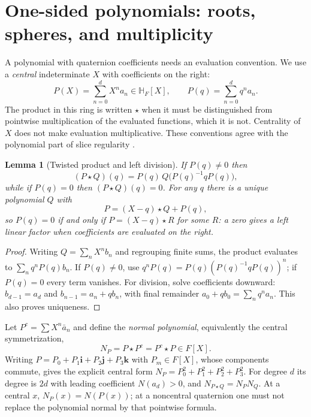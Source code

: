 \documentclass[11pt,letterpaper]{article}
\numberwithin{equation}{section}
\newtheorem{lemma}[lemma]{Lemma}
\theoremstyle{definition}
\theoremstyle{remark}
\newcommand{\HF}{\mathbb H_F}
\newcommand{\ii}{\mathbf i}
\newcommand{\jj}{\mathbf j}
\newcommand{\kk}{\mathbf k}
\begin{document}
\section{One-sided polynomials: roots, spheres, and multiplicity}\label{squat:sec:polynomials}

A polynomial with quaternion coefficients needs an evaluation convention. We use a
\emph{central} indeterminate $X$ with coefficients on the right:
\[
 P(X)=\sum_{n=0}^dX^na_n\in\HF[X],\qquad P(q)=\sum_{n=0}^dq^na_n .
\]
The product in this ring is written $\star$ when it must be distinguished from pointwise
multiplication of the evaluated functions, which it is not. Centrality of $X$ does not
make evaluation multiplicative. These conventions agree with the polynomial part of slice
regularity \cite{GP}.

\begin{lemma}[Twisted product and left division]\label{squat:lem:twisted}
If $P(q)\ne0$ then
\begin{equation}\label{squat:eq:twisted}
 (P\star Q)(q)=P(q)\,Q\bigl(P(q)^{-1}qP(q)\bigr),
\end{equation}
while if $P(q)=0$ then $(P\star Q)(q)=0$. For any $q$ there is a unique polynomial $Q$
with
\begin{equation}\label{squat:eq:leftdivision}
 P=(X-q)\star Q+P(q),
\end{equation}
so $P(q)=0$ if and only if $P=(X-q)\star R$ for some $R$: a zero gives a \emph{left}
linear factor when coefficients are evaluated on the right.
\end{lemma}
\begin{proof}
Writing $Q=\sum_nX^nb_n$ and regrouping finite sums, the product evaluates to
$\sum_nq^nP(q)b_n$. If $P(q)\ne0$, use $q^nP(q)=P(q)(P(q)^{-1}qP(q))^n$; if $P(q)=0$
every term vanishes. For division, solve coefficients downward: $b_{d-1}=a_d$ and
$b_{n-1}=a_n+qb_n$, with final remainder $a_0+qb_0=\sum_nq^na_n$. This also proves
uniqueness.
\end{proof}

Let $P^c=\sum X^n\bar a_n$ and define the \emph{normal polynomial}, equivalently the
central symmetrization,
\begin{equation}\label{squat:eq:normalpoly}
 N_P=P\star P^c=P^c\star P\in F[X].
\end{equation}
Writing $P=P_0+P_1\ii+P_2\jj+P_3\kk$ with $P_m\in F[X]$, whose components commute, gives
the explicit central form $N_P=P_0^2+P_1^2+P_2^2+P_3^2$. For degree $d$ its degree is
$2d$ with leading coefficient $N(a_d)>0$, and $N_{P\star Q}=N_PN_Q$. At a central $x$,
$N_P(x)=N(P(x))$; at a noncentral quaternion one must not replace the polynomial normal
by that pointwise formula.
\end{document}
